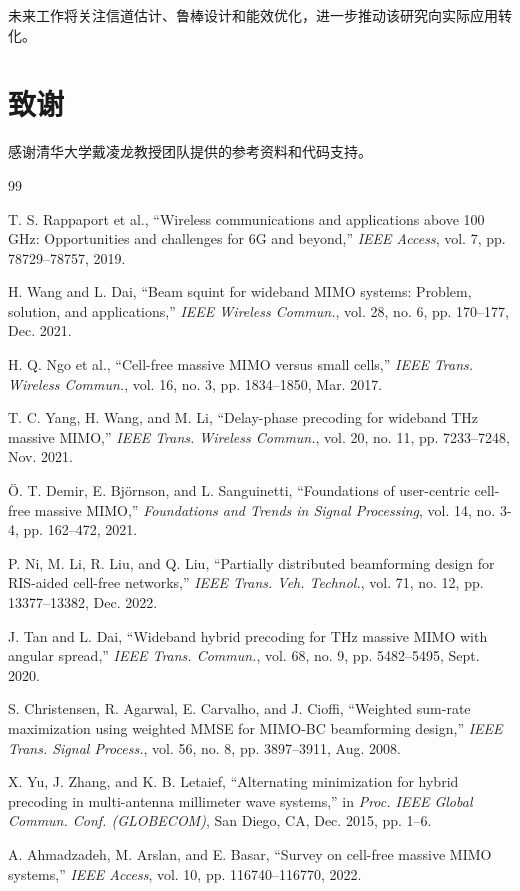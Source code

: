 \documentclass[10pt,twocolumn]{IEEEtran}
\begin{document}
未来工作将关注信道估计、鲁棒设计和能效优化，进一步推动该研究向实际应用转化。

\section*{致谢}

感谢清华大学戴凌龙教授团队提供的参考资料和代码支持。

\begin{thebibliography}{99}

T. S. Rappaport et al., ``Wireless communications and applications above 100 GHz: Opportunities and challenges for 6G and beyond,'' \textit{IEEE Access}, vol. 7, pp. 78729--78757, 2019.

H. Wang and L. Dai, ``Beam squint for wideband MIMO systems: Problem, solution, and applications,'' \textit{IEEE Wireless Commun.}, vol. 28, no. 6, pp. 170--177, Dec. 2021.

H. Q. Ngo et al., ``Cell-free massive MIMO versus small cells,'' \textit{IEEE Trans. Wireless Commun.}, vol. 16, no. 3, pp. 1834--1850, Mar. 2017.

T. C. Yang, H. Wang, and M. Li, ``Delay-phase precoding for wideband THz massive MIMO,'' \textit{IEEE Trans. Wireless Commun.}, vol. 20, no. 11, pp. 7233--7248, Nov. 2021.

Ö. T. Demir, E. Björnson, and L. Sanguinetti, ``Foundations of user-centric cell-free massive MIMO,'' \textit{Foundations and Trends in Signal Processing}, vol. 14, no. 3-4, pp. 162--472, 2021.

P. Ni, M. Li, R. Liu, and Q. Liu, ``Partially distributed beamforming design for RIS-aided cell-free networks,'' \textit{IEEE Trans. Veh. Technol.}, vol. 71, no. 12, pp. 13377--13382, Dec. 2022.

J. Tan and L. Dai, ``Wideband hybrid precoding for THz massive MIMO with angular spread,'' \textit{IEEE Trans. Commun.}, vol. 68, no. 9, pp. 5482--5495, Sept. 2020.

S. Christensen, R. Agarwal, E. Carvalho, and J. Cioffi, ``Weighted sum-rate maximization using weighted MMSE for MIMO-BC beamforming design,'' \textit{IEEE Trans. Signal Process.}, vol. 56, no. 8, pp. 3897--3911, Aug. 2008.

X. Yu, J. Zhang, and K. B. Letaief, ``Alternating minimization for hybrid precoding in multi-antenna millimeter wave systems,'' in \textit{Proc. IEEE Global Commun. Conf. (GLOBECOM)}, San Diego, CA, Dec. 2015, pp. 1--6.

A. Ahmadzadeh, M. Arslan, and E. Basar, ``Survey on cell-free massive MIMO systems,'' \textit{IEEE Access}, vol. 10, pp. 116740--116770, 2022.

\end{thebibliography}
\end{document}
